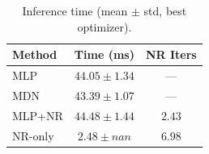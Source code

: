 \begin{table}[H]
\centering
\caption{Inference time (mean $\pm$ std, best optimizer).}
\label{tab:time}
\begin{tabular}{lcc}
\toprule
Method & Time (ms) & NR Iters \\
\midrule
MLP & $44.05 \pm 1.34$ & — \\
MDN & $43.39 \pm 1.07$ & — \\
MLP+NR & $44.48 \pm 1.44$ & $2.43$ \\
NR-only & $2.48 \pm nan$ & $6.98$ \\
\bottomrule
\end{tabular}
\end{table}
